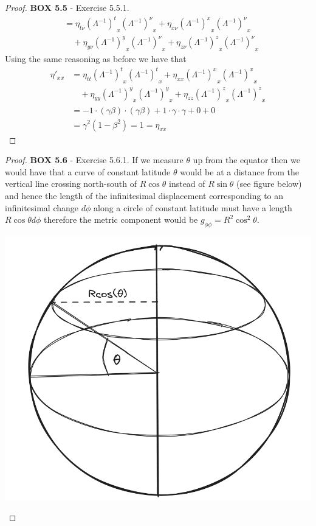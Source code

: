 \documentclass[11pt]{article}
\theoremstyle{definition}
\begin{document}
\begin{proof}{\textbf{BOX 5.5} - Exercise 5.5.1.}
\begin{align*}
        &= \eta_{t\nu}{(\Lambda^{-1})^{t}}_{x} {(\Lambda^{-1})^{\nu}}_{x}
        + \eta_{x\nu}{(\Lambda^{-1})^{x}}_{x} {(\Lambda^{-1})^{\nu}}_{x}\\
        &\quad + \eta_{y\nu}{(\Lambda^{-1})^{y}}_{x} {(\Lambda^{-1})^{\nu}}_{x}
        + \eta_{z\nu}{(\Lambda^{-1})^{z}}_{x} {(\Lambda^{-1})^{\nu}}_{x}
    \end{align*}
    Using the same reasoning as before we have that
    \begin{align*}
        \eta'_{xx}
        &= \eta_{tt}{(\Lambda^{-1})^{t}}_{x} {(\Lambda^{-1})^{t}}_{x}
        + \eta_{xx}{(\Lambda^{-1})^{x}}_{x} {(\Lambda^{-1})^{x}}_{x}\\
        &\quad + \eta_{yy}{(\Lambda^{-1})^{y}}_{x} {(\Lambda^{-1})^{y}}_{x}
        + \eta_{zz}{(\Lambda^{-1})^{z}}_{x} {(\Lambda^{-1})^{z}}_{x}\\
        &= -1\cdot (\gamma \beta) \cdot (\gamma \beta)
        + 1\cdot \gamma \cdot \gamma + 0 + 0\\
        &= \gamma^2(1 - \beta^2) = 1 = \eta_{xx}
    \end{align*}
\end{proof}
\cleardoublepage
\begin{proof}{\textbf{BOX 5.6} - Exercise 5.6.1.}
    If we measure $\theta$ up from the equator then we would have that
    a curve of constant latitude $\theta$ would be at a distance from the
    vertical line crossing north-south of $R\cos\theta$ instead of
    $R\sin\theta$ (see figure below) and hence the length of the infinitesimal
    displacement corresponding to an infinitesimal change $d\phi$ along a
    circle of constant latitude must have a length $R\cos\theta d\phi$
    therefore the metric component would be $g_{\phi\phi} = R^2\cos^2\theta$.
    \begin{center}
        \includegraphics*[scale=0.3]{ch5_5.6.1.png}
    \end{center}
\end{proof}
\end{document}

